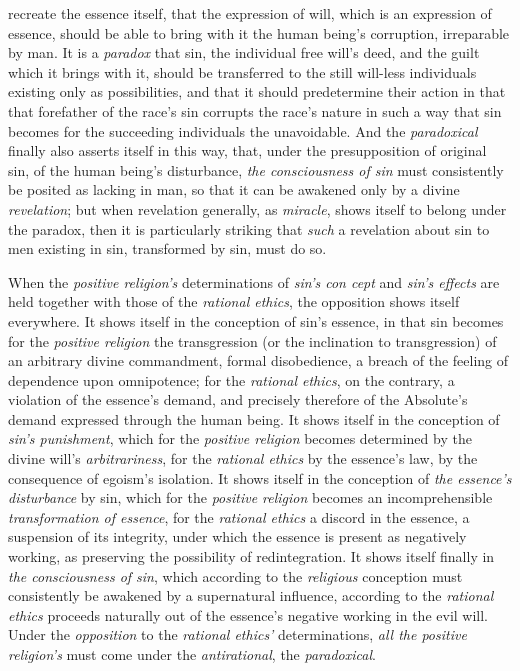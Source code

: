 \documentclass[12pt,a4paper]{book}
\begin{document}
recreate the essence itself, that the expression of will, which is an expression
of essence, should be able to bring with it the human being's corruption,
irreparable by man. It is a \emph{paradox} that sin, the individual free will's
deed, and the guilt which it brings with it, should be transferred to the still
will-less individuals existing only as possibilities, and that it should
predetermine their action in that that forefather of the race's sin corrupts the
race's nature in such a way that sin becomes for the succeeding individuals the
unavoidable. And the \emph{paradoxical} finally also asserts itself in this way,
that, under the presupposition of original sin, of the human being's
disturbance, \emph{the consciousness of sin} must consistently be posited as
lacking in man, so that it can be awakened only by a divine \emph{revelation};
but when revelation generally, as \emph{miracle}, shows itself to belong under
the paradox, then it is particularly striking that \emph{such} a revelation about
sin to men existing in sin, transformed by sin, must do so.

When the \emph{positive religion's} determinations of \emph{sin's con\-%
cept} and \emph{sin's effects} are held together with those of the
\emph{rational ethics}, the opposition shows itself everywhere. It shows itself
in the conception of sin's essence, in that sin becomes for the \emph{positive
religion} the transgression (or the inclination to transgression) of an
arbitrary divine commandment, formal disobedience, a breach of the feeling of
dependence upon omnipotence; for the \emph{rational ethics}, on the contrary, a
violation of the essence's demand, and precisely therefore of the Absolute's
demand expressed through the human being. It shows itself in the conception of
\emph{sin's punishment}, which for the \emph{positive religion} becomes
determined by the divine will's \emph{arbitrariness}, for the \emph{rational
ethics} by the essence's law, by the consequence of egoism's isolation. It shows
itself in the conception of \emph{the essence's disturbance} by sin, which for
the \emph{positive religion} becomes an incomprehensible \emph{transformation of
essence}, for the \emph{rational ethics} a discord in the essence, a suspension
of its integrity, under which the essence is present as negatively working, as
preserving the possibility of redintegration. It shows itself finally in
\emph{the consciousness of sin}, which according to the \emph{religious}
conception must consistently be awakened by a supernatural influence, according
to the \emph{rational ethics} proceeds naturally out of the essence's negative
working in the evil will. Under the \emph{opposition} to the \emph{rational
ethics'} determinations, \emph{all the positive religion's} must come under the
\emph{antirational}, the \emph{paradoxical}.
\end{document}
